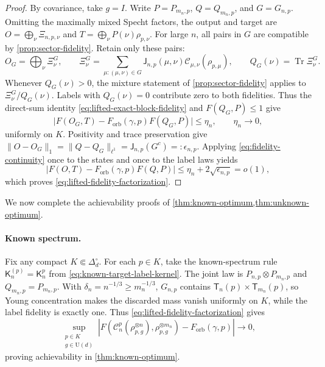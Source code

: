 \documentclass[11pt]{article}
\theoremstyle{remark}
\theoremstyle{plain}
\newcommand{\cC}{\mathcal C}
\newcommand{\U}{\mathrm U}
\newcommand{\Tr}{\operatorname{Tr}}
\newcommand{\ot}{\otimes}
\newcommand{\Forb}{F_{\mathrm{orb}}}
\begin{document}
\begin{proof}
By covariance, take \(g=I\).  Write \(P=P_{m_n,p}\), \(Q=Q_{m_n,p}\),
and \(G=G_{n,p}\).  Omitting the maximally mixed Specht factors,
the output and target are \(O=\bigoplus_\nu\Xi_{n,p,\nu}\) and
\(T=\bigoplus_\nu P(\nu)\rho_{p,\nu}\).  For large \(n\), all pairs in
\(G\) are compatible by \cref{prop:sector-fidelity}.  Retain only these pairs:
\[
 O_G=\bigoplus_\nu\Xi_\nu^G,
 \qquad
 \Xi_\nu^G=\sum_{\mu:(\mu,\nu)\in G}
      \mathsf J_{n,p}(\mu,\nu)\cC_{\mu,\nu}(\rho_{p,\mu}),
 \qquad Q_G(\nu)=\Tr\Xi_\nu^G.
\]
Whenever \(Q_G(\nu)>0\), the mixture statement of
\cref{prop:sector-fidelity} applies to \(\Xi_\nu^G/Q_G(\nu)\).
Labels with \(Q_G(\nu)=0\) contribute zero to both fidelities. Thus the
direct-sum identity \eqref{eq:lifted-exact-block-fidelity} and
\(F(Q_G,P)\le1\) give
\[
 \bigl|F(O_G,T)-\Forb(\gamma,p)F(Q_G,P)\bigr|\le\eta_n,
 \qquad \eta_n\longrightarrow0,
\]
uniformly on \(K\).  Positivity and trace preservation give
\(\|O-O_G\|_1=\|Q-Q_G\|_{\ell^1}=\mathsf J_{n,p}(G^c)=:\epsilon_{n,p}\).
Applying \eqref{eq:fidelity-continuity} once to the states and once to
the label laws yields
\[
 \bigl|F(O,T)-\Forb(\gamma,p)F(Q,P)\bigr|
 \le\eta_n+2\sqrt{\epsilon_{n,p}}=o(1),
\]
which proves \eqref{eq:lifted-fidelity-factorization}.
\end{proof}

We now complete the achievability proofs of \cref{thm:known-optimum,thm:unknown-optimum}.
\paragraph{Known spectrum.}
Fix any compact \(K\Subset\Delta_d^\circ\).  For each \(p\in K\), take
the known-spectrum rule \(\mathsf K_n^{(p)}=\mathsf K_n^p\) from
\eqref{eq:known-target-label-kernel}.
The joint law is \(P_{n,p}\ot P_{m_n,p}\) and
\(Q_{m_n,p}=P_{m_n,p}\).  With \(\delta_n=n^{-1/3}\ge m_n^{-1/3}\),
\(G_{n,p}\) contains \(\mathsf T_n(p)\times\mathsf T_{m_n}(p)\), so Young
concentration makes the discarded mass vanish uniformly on \(K\), while
the label fidelity is exactly one.  Thus
\eqref{eq:lifted-fidelity-factorization} gives
\[
 \sup_{\substack{p\in K\\g\in\U(d)}}
 \left|F\!\left(\cC_n^p(\rho_{p,g}^{\ot n}),
                      \rho_{p,g}^{\ot m_n}\right)
             -\Forb(\gamma,p)\right|\longrightarrow0,
\]
proving achievability in \cref{thm:known-optimum}.
\end{document}
